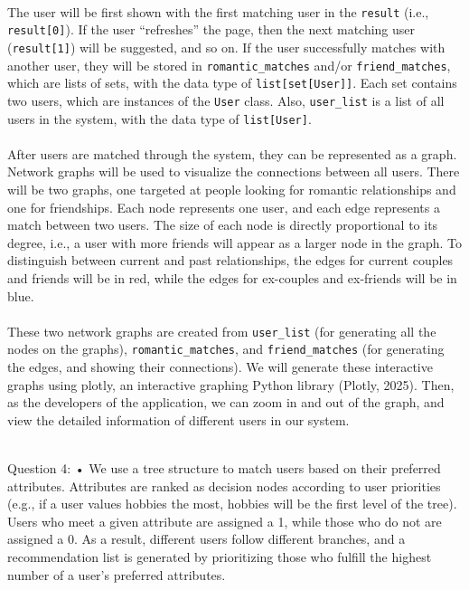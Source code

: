 \documentclass[fontsize=11pt]{article}
\begin{document}
\\
The user will be first shown with the first matching user in the \texttt{result}  (i.e., \texttt{result[0]}).
If the user “refreshes” the page, then the next matching user (\texttt{result[1]}) will be suggested, and so on.
If the user successfully matches with another user, they will be stored in \texttt{romantic\_matches} and/or \texttt{friend\_matches},
which are lists of sets, with the data type of \texttt{list[set[User]]}.
Each set contains two users, which are instances of the \texttt{User} class.
Also, \texttt{user\_list} is a list of all users in the system, with the data type of \texttt{list[User]}.
\\
\\
After users are matched through the system, they can be represented as a graph.
Network graphs will be used to visualize the connections between all users.
There will be two graphs, one targeted at people looking for romantic relationships and one for friendships.
Each node represents one user, and each edge represents a match between two users.
The size of each node is directly proportional to its degree, i.e., a user with more friends will appear as a larger node in the graph.
To distinguish between current and past relationships, the edges for current couples and friends will be in red, while the edges for ex-couples and ex-friends will be in blue.
\\
\\
These two network graphs are created from \texttt{user\_list} (for generating all the nodes on the graphs),
\texttt{romantic\_matches}, and \texttt{friend\_matches} (for generating the edges, and showing their connections).
We will generate these interactive graphs using plotly, an interactive graphing Python library (Plotly, 2025).
Then, as the developers of the application, we can zoom in and out of the graph, and view the detailed information of different users in our system.


\\ 
Question 4: 
	• We use a tree structure to match users based on their preferred attributes. Attributes are ranked as decision nodes according to user priorities (e.g., if a user values hobbies the most, hobbies will be the first level of the tree). Users who meet a given attribute are assigned a 1, while those who do not are assigned a 0. As a result, different users follow different branches, and a recommendation list is generated by prioritizing those who fulfill the highest number of a user's preferred attributes.
\end{document}
